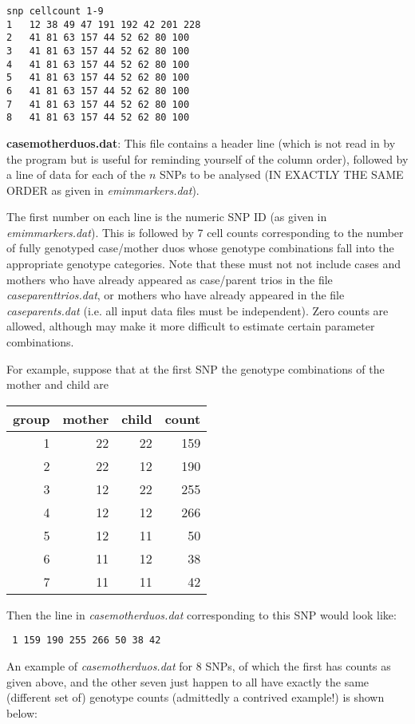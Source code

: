 \documentclass[a4paper,11pt]{report}
\begin{document}
\begin{verbatim}
snp	cellcount 1-9
1 	12 38 49 47 191 192 42 201 228
2 	41 81 63 157 44 52 62 80 100
3 	41 81 63 157 44 52 62 80 100
4 	41 81 63 157 44 52 62 80 100
5 	41 81 63 157 44 52 62 80 100
6 	41 81 63 157 44 52 62 80 100
7 	41 81 63 157 44 52 62 80 100
8 	41 81 63 157 44 52 62 80 100
\end{verbatim}
 \bigskip



	{\bf  casemotherduos.dat}:  This file contains a header line
(which is not read in by the program but is useful for reminding
yourself of the  column order), followed by a line of data
for each of the $n$ SNPs to be analysed (IN EXACTLY THE SAME ORDER
as given in {\it emimmarkers.dat}).

The first number on each line is the numeric SNP ID (as given in {\it emimmarkers.dat}). This is followed by 7 cell counts corresponding to the number
of fully genotyped case/mother duos whose genotype combinations
fall into the appropriate genotype categories. Note that these
must not not include cases and mothers
who have already appeared as case/parent 
trios in the file {\it  caseparenttrios.dat},
or mothers
who have already appeared in the file  {\it  caseparents.dat} (i.e. all input data files must be
independent).
Zero counts are allowed, although
may make it more difficult to estimate certain parameter combinations.

For example, suppose that at the first SNP the genotype combinations of the mother and child are

\begin{tabular}{rrrr} 
group    &   mother &child   &count \\ \hline
1 &22 &22       &159\\
2 &22 &12       &190\\
3 &12 &22       &255\\
4 &12 &12       &266\\
5 &12 &11 &50\\
6 &11 &12 &38\\
7 &11 &11 &42\\
\end{tabular}

Then the line in	{\it  casemotherduos.dat} corresponding to this SNP 
would look like:

{\tt
1 	159 190 255 266 50 38 42
}

An example of {\it  casemotherduos.dat} for 8 SNPs, of which the first has counts as given above, and the other seven just happen to all have exactly the same (different set of) genotype counts (admittedly a contrived example!) is shown below:
\newpage
\end{document}
